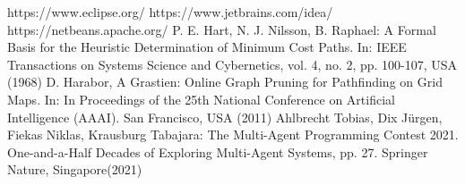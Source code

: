 
\begin{thebibliography}{8}
	 https://www.eclipse.org/
	 https://www.jetbrains.com/idea/
	 https://netbeans.apache.org/	
	P. E. Hart, N. J. Nilsson, B. Raphael: A Formal Basis for the Heuristic Determination of Minimum Cost Paths. In: IEEE Transactions on Systems Science and Cybernetics, vol. 4, no. 2, pp. 100-107, USA (1968) 
	D. Harabor, A Grastien: Online Graph Pruning for Pathfinding on Grid Maps. In: In Proceedings of the 25th National Conference on Artificial Intelligence (AAAI). San Francisco, USA (2011)	
	 Ahlbrecht Tobias, Dix Jürgen, Fiekas Niklas, Krausburg Tabajara: The Multi-Agent Programming Contest 2021. One-and-a-Half Decades of Exploring Multi-Agent Systems, pp. 27. Springer Nature, Singapore(2021)

	
\end{thebibliography}